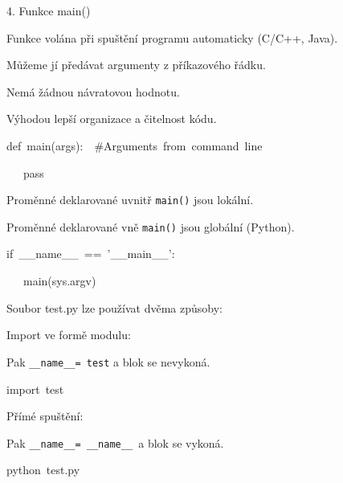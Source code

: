 \documentclass[czech]{beamer}
\newenvironment{lyxcode}
  {\par\begin{list}{}{
    \setlength{\rightmargin}{\leftmargin}
    \setlength{\listparindent}{0pt}%
    \raggedright
    \setlength{\itemsep}{0pt}
    \setlength{\parsep}{0pt}
    \normalfont\ttfamily}%
   \def\{{\char`\{}
   \def\}{\char`\}}
   \def\textasciitilde{\char`\~}
   \item[]}
  {\end{list}}
\begin{document}
\begin{frame}{4. Funkce main()}

{\footnotesize Funkce volána při spuštění programu automaticky (C/C++,
Java).\medskip{}
}{\footnotesize\par}

{\footnotesize Můžeme jí předávat argumenty z příkazového řádku.}{\footnotesize\par}

{\footnotesize Nemá žádnou návratovou hodnotu.\medskip{}
}{\footnotesize\par}

{\footnotesize Výhodou lepší organizace a čitelnost kódu.}{\footnotesize\par}
\begin{lyxcode}
{\footnotesize def~main(args):~~\#Arguments~from~command~line}{\footnotesize\par}

{\footnotesize ~~~pass}{\footnotesize\par}
\end{lyxcode}
{\footnotesize Proměnné deklarované uvnitř }{\footnotesize\texttt{main()}}{\footnotesize{}
jsou lokální. }{\footnotesize\par}

{\footnotesize Proměnné deklarované vně }{\footnotesize\texttt{main()}}{\footnotesize{}
jsou globální (Python).}{\footnotesize\par}
\begin{lyxcode}
{\footnotesize if~\_\_name\_\_~==~'\_\_main\_\_':}{\footnotesize\par}

{\footnotesize ~~~main(sys.argv)}{\footnotesize\par}
\end{lyxcode}
{\footnotesize Soubor test.py lze používat dvěma způsoby:}{\footnotesize\par}
\begin{enumerate}
\item {\footnotesize Import ve formě modulu:}{\footnotesize\par}

{\footnotesize Pak }{\footnotesize\texttt{\_\_name\_\_= test}}{\footnotesize{}
a blok se nevykoná.}{\footnotesize\par}
\begin{lyxcode}
{\footnotesize import~test}{\footnotesize\par}
\end{lyxcode}
\item {\footnotesize Přímé spuštění:}{\footnotesize\par}

{\footnotesize Pak }{\footnotesize\texttt{\_\_name\_\_= \_\_name\_\_
}}{\footnotesize a blok se vykoná.}{\footnotesize\par}
\begin{lyxcode}
{\footnotesize python~test.py}{\footnotesize\par}
\end{lyxcode}
\end{enumerate}
\end{frame}
\end{document}

